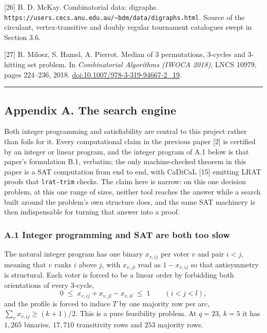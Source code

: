 \documentclass[
]{article}
\begin{document}
{[}26{]} B. D. McKay. Combinatorial data: digraphs.
\texttt{https://users.cecs.anu.edu.au/\textasciitilde{}bdm/data/digraphs.html}.
Source of the circulant, vertex-transitive and doubly regular tournament
catalogues swept in Section 3.6.

{[}27{]} R. Milosz, S. Hamel, A. Pierrot. Median of 3 permutations,
3-cycles and 3-hitting set problem. In \emph{Combinatorial Algorithms
(IWOCA 2018)}, LNCS 10979, pages 224--236, 2018.
\url{doi:10.1007/978-3-319-94667-2_19}.

\begin{center}\rule{0.5\linewidth}{0.5pt}\end{center}

\subsection{Appendix A. The search
engine}\label{appendix-a.-the-search-engine}

Both integer programming and satisfiability are central to this project
rather than foils for it. Every computational claim in the previous
paper {[}2{]} is certified by an integer or linear program, and the
integer program of A.1 below is that paper's formulation B.1, verbatim;
the only machine-checked theorem in this paper is a SAT computation from
end to end, with CaDiCaL {[}15{]} emitting LRAT proofs that
\texttt{lrat-trim} checks. The claim here is narrow: on this one
decision problem, at this one range of sizes, neither tool reaches the
answer while a search built around the problem's own structure does, and
the same SAT machinery is then indispensable for turning that answer
into a proof.

\subsubsection{A.1 Integer programming and SAT are both too
slow}\label{a.1-integer-programming-and-sat-are-both-too-slow}

The natural integer program has one binary \(x_{v,ij}\) per voter \(v\)
and pair \(i < j\), meaning that \(v\) ranks \(i\) above \(j\), with
\(x_{v,ji}\) read as \(1 - x_{v,ij}\) so that antisymmetry is
structural. Each voter is forced to be a linear order by forbidding both
orientations of every \(3\)-cycle,
\[0 \;\le\; x_{v,ij} + x_{v,jl} - x_{v,il} \;\le\; 1 \qquad (i < j < l),\]
and the profile is forced to induce \(T\) by one majority row per arc,
\(\sum_{v} x_{v,ij} \ge (k+1)/2\). This is a pure feasibility problem.
At \(q = 23\), \(k = 5\) it has \(1{,}265\) binaries, \(17{,}710\)
transitivity rows and \(253\) majority rows.
\end{document}
